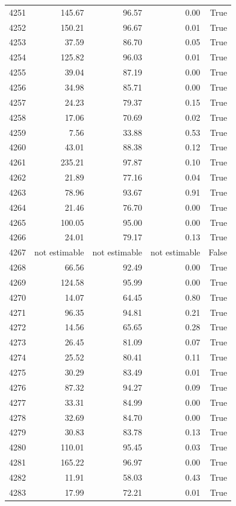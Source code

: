 \begin{longtable}{rrrrr}
4251 & 145.67 & 96.57 & 0.00 & True \\
4252 & 150.21 & 96.67 & 0.01 & True \\
4253 & 37.59 & 86.70 & 0.05 & True \\
4254 & 125.82 & 96.03 & 0.01 & True \\
4255 & 39.04 & 87.19 & 0.00 & True \\
4256 & 34.98 & 85.71 & 0.00 & True \\
4257 & 24.23 & 79.37 & 0.15 & True \\
4258 & 17.06 & 70.69 & 0.02 & True \\
4259 & 7.56 & 33.88 & 0.53 & True \\
4260 & 43.01 & 88.38 & 0.12 & True \\
4261 & 235.21 & 97.87 & 0.10 & True \\
4262 & 21.89 & 77.16 & 0.04 & True \\
4263 & 78.96 & 93.67 & 0.91 & True \\
4264 & 21.46 & 76.70 & 0.00 & True \\
4265 & 100.05 & 95.00 & 0.00 & True \\
4266 & 24.01 & 79.17 & 0.13 & True \\
4267 & not estimable & not estimable & not estimable & False \\
4268 & 66.56 & 92.49 & 0.00 & True \\
4269 & 124.58 & 95.99 & 0.00 & True \\
4270 & 14.07 & 64.45 & 0.80 & True \\
4271 & 96.35 & 94.81 & 0.21 & True \\
4272 & 14.56 & 65.65 & 0.28 & True \\
4273 & 26.45 & 81.09 & 0.07 & True \\
4274 & 25.52 & 80.41 & 0.11 & True \\
4275 & 30.29 & 83.49 & 0.01 & True \\
4276 & 87.32 & 94.27 & 0.09 & True \\
4277 & 33.31 & 84.99 & 0.00 & True \\
4278 & 32.69 & 84.70 & 0.00 & True \\
4279 & 30.83 & 83.78 & 0.13 & True \\
4280 & 110.01 & 95.45 & 0.03 & True \\
4281 & 165.22 & 96.97 & 0.00 & True \\
4282 & 11.91 & 58.03 & 0.43 & True \\
4283 & 17.99 & 72.21 & 0.01 & True \\

\end{longtable}
